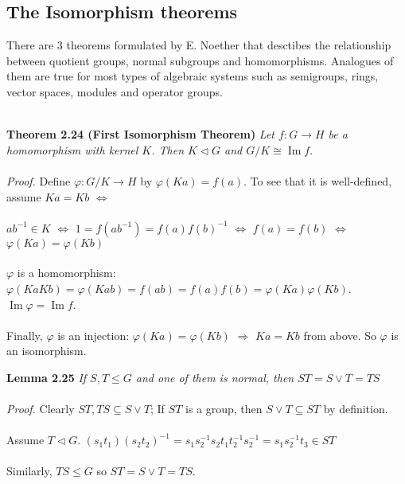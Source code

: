 \documentclass{article}
\DeclareMathOperator{\im}{Im}
\begin{document}
\subsection{The Isomorphism theorems}
There are 3 theorems formulated by E. Noether that desctibes the relationship between quotient groups, normal subgroups and homomorphisms. 
Analogues of them are true for most types of algebraic systems such as semigroups, rings, vector spaces, modules and operator groups.\\\\
\begin{redrules}\color{red}
\textbf{Theorem 2.24 (First Isomorphism Theorem)} \textit{Let \(f:G\to H\) be a homomorphism with kernel \(K\). Then \(K\vartriangleleft G\) and \(G/K\cong \im f\)}.\\\\\color{black}
\textit{Proof.} Define \(\varphi: G/K\to H\) by \(\varphi(Ka)=f(a)\). To see that it is well-defined, assume \(Ka=Kb\) \(\Longleftrightarrow\)\\\\ \(ab^{-1}\in K\) \(\Longleftrightarrow\) \(1=f(ab^{-1})=f(a)f(b)^{-1}\) \(\Longleftrightarrow\) \(f(a)=f(b)\) \(\Longleftrightarrow\) \(\varphi(Ka)=\varphi(Kb)\)\\\\
\(\varphi\) is a homomorphism: \(\varphi(KaKb)=\varphi(Kab)=f(ab)=f(a)f(b)=\varphi(Ka)\varphi(Kb)\). \(\im\varphi=\im f\).\\\\
Finally, \(\varphi\) is an injection: \(\varphi(Ka)=\varphi(Kb)\) \(\Longrightarrow\) \(Ka=Kb\) from above. So \(\varphi\) is an isomorphism.
\begin{center}
\end{center}
\end{redrules}
\begin{greenrules}\color{OliveGreen}
\textbf{Lemma 2.25} \textit{If \(S,T\le G\) and one of them is normal, then \(ST=S\lor T=TS\)}\\\\\color{black}
\textit{Proof.} Clearly \(ST,TS\subseteq S\lor T\); If \(ST\) is a group, then \(S\lor T\subseteq ST\) by definition.\\\\
Assume \(T\vartriangleleft G\). \((s_{1}t_{1})(s_{2}t_{2})^{-1}=s_{1}s_{2}^{-1}s_{2}t_{1}t_{2}^{-1}s_{2}^{-1}=s_{1}s_{2}^{-1}t_{3}\in ST\)\\\\
Similarly, \(TS\le G\) so \(ST=S\lor T=TS\).
\end{greenrules}
\end{document}
